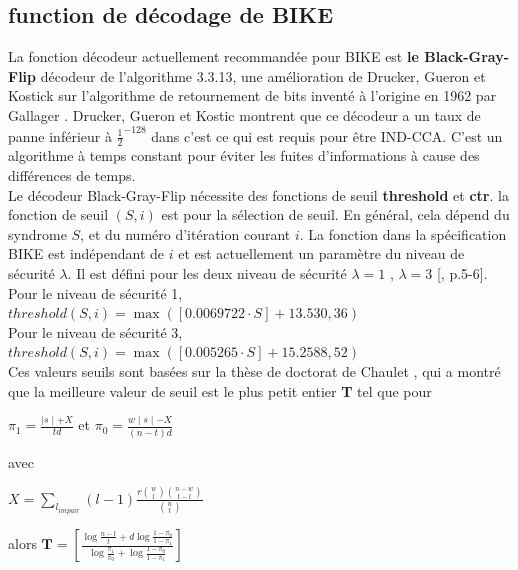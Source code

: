 \documentclass[12pt,openany]{report}
\begin{document}
\subsection{function de décodage de BIKE}
La fonction décodeur actuellement recommandée pour BIKE est \textbf{le Black-Gray-Flip} 
décodeur de l'algorithme 3.3.13, une amélioration de Drucker, Gueron et Kostick \cite{drucker2019}
sur l'algorithme de retournement de bits inventé à l'origine en 1962 par Gallager \cite{R_G_Gallager}. Drucker,
Gueron et Kostic montrent que ce décodeur a un taux de panne inférieur à $ \frac{1}{2}^{-128}$ dans \cite{drucker2019}
c'est ce qui est requis pour être IND-CCA. C'est un algorithme à temps constant pour éviter les fuites d'informations à cause des différences de temps.\\
Le décodeur Black-Gray-Flip nécessite des fonctions de seuil \textbf{threshold} et \textbf{ctr}. 
la fonction de seuil $(S, i)$ est pour la sélection de seuil. En général, cela dépend du syndrome $S$, et du numéro d'itération courant $i$. La fonction dans la spécification BIKE
est indépendant de $i$ et est actuellement un paramètre du niveau de sécurité $\lambda$. Il est défini
pour les deux niveau de sécurité $\lambda = 1$ , $\lambda = 3$ [\cite{NGK}, p.5-6].\\ Pour le niveau de sécurité 1,
$threshold(S,i)=\max([0.0069722 \cdot S] + 13.530,36)$\\
Pour le niveau de sécurité 3,$threshold(S,i)=\max([0.005265 \cdot S] + 15.2588,52)$\\
Ces valeurs seuils sont basées sur la thèse de doctorat de Chaulet \cite{chaulet2017}, qui a montré que
la meilleure valeur de seuil est le plus petit entier \textbf{T} tel que pour \\
\begin{center}
 $
\pi_1=\frac{\mid s \mid + X}{td}$\hspace{1cm} et \hspace{1cm} $\pi_0=\frac{w\mid s \mid -X}{(n-t)d}$
\end{center}
\hspace{3 cm} avec 
\begin{center}


$ X=
   \sum_{l_{impair}} (l-1)\frac{r{w\choose l}{n-w \choose t-l}}{{n\choose t}} 
$
\end{center}

\hspace{3 cm} alors $\mathbf{T}=\left[ \frac{\log{\frac{n-t}{t}}+d\log{\frac{1-\pi_0}{1-\pi_1}}}{\log{\frac{\pi_1}{\pi_0}}+\log{\frac{1-\pi_0}{1-\pi_1}}} \right]    $\\
\end{document}

